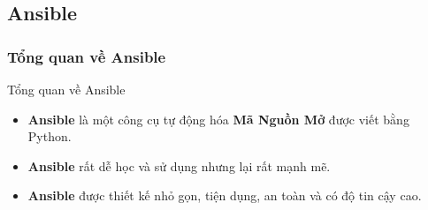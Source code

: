 \documentclass[14pt]{beamer}
\begin{document}
\subsection{Ansible}
\subsubsection*{Tổng quan về Ansible}

\begin{frame}{Tổng quan về Ansible}
\renewcommand{\baselinestretch}{1.50}\normalsize
  \begin{itemize}
    \item \textbf{Ansible} là một công cụ tự động hóa \textbf{Mã Nguồn Mở} được viết bằng Python.
    \pause
    \item \textbf{Ansible} rất dễ học và sử dụng nhưng lại rất mạnh mẽ.
    \pause
    \item \textbf{Ansible} được thiết kế nhỏ gọn, tiện dụng, an toàn và có độ tin cậy cao.
  \end{itemize}
\renewcommand{\baselinestretch}{1.0}\normalsize
\end{frame}
\end{document}
